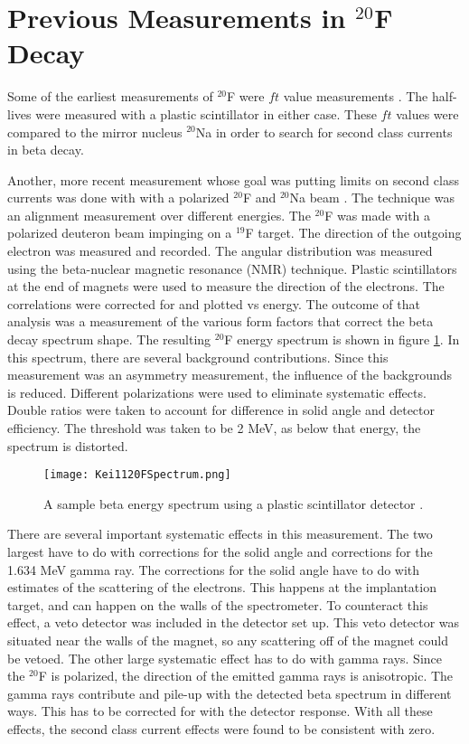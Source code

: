 \documentclass[../MaxHughesThesis.tex]{subfiles}
\begin{document}
\section{Previous Measurements in $^{20}$F Decay}

Some of the earliest measurements of $^{20}$F were $ft$ value measurements \cite{Wil70} \cite{Alb75}.
The half-lives were measured with a plastic scintillator in either case.  
These $ft$ values were compared to the mirror nucleus $^{20}$Na in order to search for second class currents in beta decay. 

Another, more recent measurement whose goal was putting limits on second class currents was done with with a polarized $^{20}$F and $^{20}$Na beam \cite{Min11}.
The technique was an alignment measurement over different energies.
The $^{20}$F was made with a polarized deuteron beam impinging on a $^{19}$F target. 
The direction of the outgoing electron was measured and recorded.
The angular distribution was measured using the beta-nuclear magnetic resonance (NMR) technique.
Plastic scintillators at the end of magnets were used to measure the direction of the electrons.
The correlations were corrected for and plotted vs energy.
The outcome of that analysis was a measurement of the various form factors that correct the beta decay spectrum shape. 
The resulting $^{20}$F energy spectrum is shown in figure \ref{fig:keispec}.
In this spectrum, there are several background contributions. 
Since this measurement  was an asymmetry measurement, the influence of the backgrounds is reduced. 
Different polarizations were used to eliminate systematic effects.
Double ratios were taken to account for difference in solid angle and detector efficiency.
The threshold was taken to be 2 MeV, as below that energy, the spectrum is distorted.

\begin{figure}[!htb]
	\centerline{\texttt{[image: Kei1120FSpectrum.png]}}
	\caption{A sample beta energy spectrum using a plastic scintillator detector \cite{Min11}.}
	\label{fig:keispec}
\end{figure}

There are several important systematic effects in this measurement.
The two largest have to do with corrections for the solid angle and corrections for the 1.634 MeV gamma ray.
The corrections for the solid angle have to do with estimates of the scattering of the electrons.
This happens at the implantation target, and can happen on the walls of the spectrometer.
To counteract this effect, a veto detector was included in the detector set up. 
This veto detector was situated near the walls of the magnet, so any scattering off of the magnet could be vetoed. 
The other large systematic effect has to do with gamma rays.
Since the $^{20}$F is polarized, the direction of the emitted gamma rays is anisotropic.
The gamma rays contribute and pile-up with the detected beta spectrum in different ways.
This has to be corrected for with the detector response.
With all these effects, the second class current effects were found to be consistent with zero.   
\end{document}
